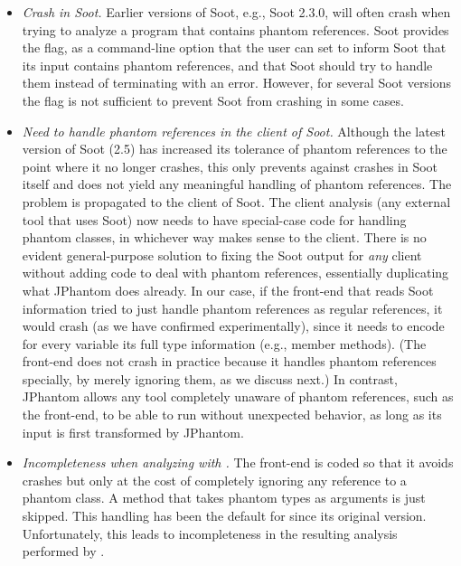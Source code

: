 \begin{itemize}[--]
\item \emph{Crash in Soot.} Earlier versions of Soot, e.g.,
  Soot 2.3.0, will often crash when trying to analyze a program that
  contains phantom references.
  Soot provides the  flag, as a command-line
  option that the user can set to inform Soot that its input contains
  phantom references, and that Soot should try to handle them instead
  of terminating with an error. However, for several Soot versions the
  flag is not sufficient to prevent Soot from crashing in some cases.

\item \emph{Need to handle phantom references in the client of
  Soot.} Although the latest version of Soot (2.5) has increased its
  tolerance of phantom references to the point where it no longer
  crashes, this only prevents against crashes in Soot itself and does
  not yield any meaningful handling of phantom references.  The
  problem is propagated to the client of Soot. The client analysis
  (any external tool that uses Soot) now needs to have special-case
  code for handling phantom classes, in whichever way makes sense to
  the client. There is no evident general-purpose solution to fixing
  the Soot output for \emph{any} client without adding code to deal
  with phantom references, essentially duplicating what JPhantom does
  already. In our case, if the \doop{} front-end that reads Soot
  information tried to just handle phantom references as regular
  references, it would crash (as we have confirmed experimentally),
  since it needs to encode for every variable its full type
  information (e.g., member methods).  (The \doop{} front-end does not
  crash in practice because it handles phantom references specially,
  by merely ignoring them, as we discuss next.) In contrast, JPhantom
  allows any tool completely unaware of phantom references, such as
  the \doop{} front-end, to be able to run without unexpected behavior,
  as long as its input is first transformed by JPhantom.

\item \emph{Incompleteness when analyzing with \doop{}.} The \doop{}
  front-end is coded so that it avoids crashes but only at the cost of
  completely ignoring any reference to a phantom class. A method that
  takes phantom types as arguments is just skipped. This handling has
  been the default for \doop{} since its original version.
  Unfortunately, this leads to incompleteness in the resulting
  analysis performed by \doop{}.


\end{itemize}
